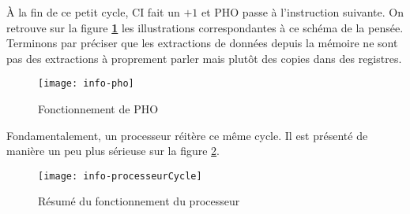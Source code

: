 \documentclass[12pt,a4paper]{report}
\begin{document}
À la fin de ce petit cycle, CI fait un $+1$ et PHO passe à l'instruction suivante. On retrouve sur la figure \textbf{\ref{fig:pho}} les illustrations correspondantes à ce schéma de la pensée. Terminons par préciser que les extractions de données depuis la mémoire ne sont pas des extractions à proprement parler mais plutôt des copies dans des registres.
\begin{figure}[!h]
\texttt{[image: info-pho]}
\caption{Fonctionnement de PHO}
\label{fig:pho}
\end{figure}
Fondamentalement, un processeur réitère ce même cycle. Il est présenté de manière un peu plus sérieuse sur la figure \ref{fig:processeurCycle}.
\begin{figure}[h!]
    \centering
    \texttt{[image: info-processeurCycle]}
    \caption{Résumé du fonctionnement du processeur}
    \label{fig:processeurCycle}
\end{figure}
\end{document}

